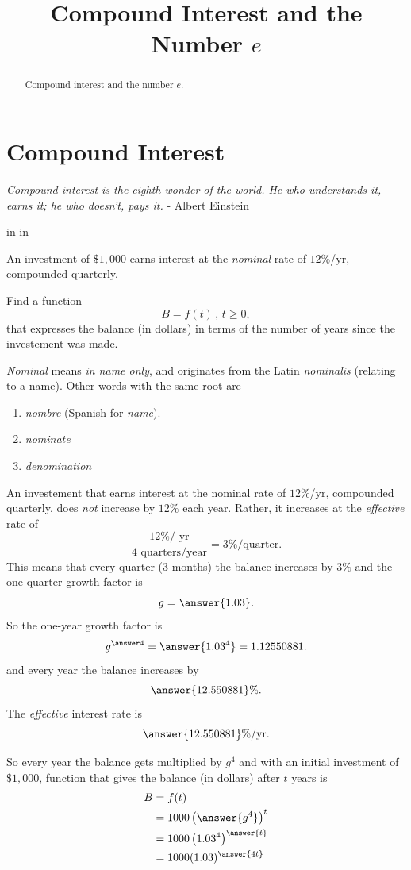 \documentclass{ximera}
\title{Compound Interest and the Number $e$}
\newcommand{\pskip}{\vskip 0.1 in}
\begin{document}
\begin{abstract}
Compound interest and the number $e$.
\end{abstract}
\maketitle


\section{Compound Interest}
 
\emph{Compound interest is the eighth wonder of the world. He who understands it, earns it; he who doesn't, pays it.} - Albert Einstein

\pskip \pskip
 
\begin{example} \label{Exdf831e3mzx}
An investment of $\$1,000$ earns interest at the \emph{nominal} rate of $12\%$/yr, compounded quarterly.

Find a function 
\[
   B = f(t) \, , \, t\geq 0,
\]
that expresses the balance (in dollars) in terms of the number of years since the investement was made.

\begin{explanation}
\emph{Nominal} means \emph{in name only}, and originates from the Latin \emph{nominalis} (relating to a name). Other words with the same root are 

\begin{enumerate}
\item \emph{nombre} (Spanish for \emph{name}).

\item \emph{nominate}

\item \emph{denomination}
\end{enumerate}

An investement that earns interest at the nominal rate of $12\%$/yr, compounded quarterly, does \emph{not} increase by $12\%$ each year. Rather, it increases at the \emph{effective} rate of 
\[
   \frac{12\%/\text{ yr}}{4 \text{ quarters/year}} = 3\%/\text{quarter} .
\]
This means that every quarter (3 months) the balance increases by $3\%$ and the one-quarter growth factor is
\[
   g = \answer{1.03} .
\]
So the one-year growth factor is
\[
   g^{\answer 4} = \answer{1.03^4} = 1.12550881.
\]
and every year the balance increases by 
\[
     \answer{12.550881}    \% .
\]
The \emph{effective} interest rate is
\[
               \answer{12.550881}    \% / \text{yr} . 
\]

So every year the balance gets multiplied by $g^4$ and with an initial investment of $\$1,000$, function that gives the balance (in dollars) after $t$ years is
\begin{align*}
   B &= f(t)  \\
      &= 1000\left( \answer{g^4} \right)^t  \\
      &= 1000\left( 1.03^4 \right)^{\answer{t}} \\ 
     &= 1000(1.03)^{\answer{4t}}
\end{align*}

\end{explanation}
\end{example}
\end{document}
